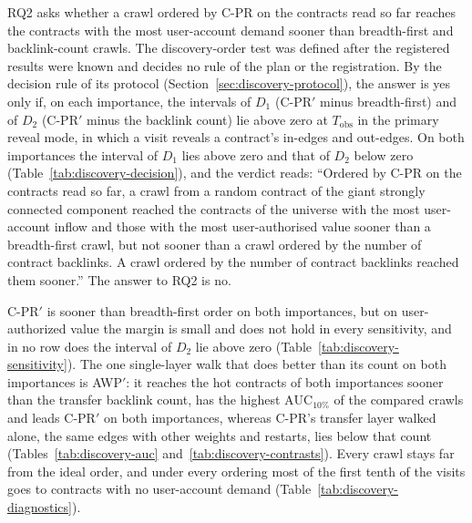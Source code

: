 RQ2 asks whether a crawl ordered by \mbox{C-PR} on the contracts read so far reaches the contracts with the most user-account demand sooner than breadth-first and backlink-count crawls. The discovery-order test was defined after the registered results were known and decides no rule of the plan or the registration. By the decision rule of its protocol (Section~\ref{sec:discovery-protocol}), the answer is yes only if, on each importance, the intervals of $D_1$ (\mbox{C-PR}$'$ minus breadth-first) and of $D_2$ (\mbox{C-PR}$'$ minus the backlink count) lie above zero at $T_{\mathrm{obs}}$ in the primary reveal mode, in which a visit reveals a contract's in-edges and out-edges. On both importances the interval of $D_1$ lies above zero and that of $D_2$ below zero (Table~\ref{tab:discovery-decision}), and the verdict reads: ``Ordered by \mbox{C-PR} on the contracts read so far, a crawl from a random contract of the giant strongly connected component reached the contracts of the universe with the most user-account inflow and those with the most user-authorised value sooner than a breadth-first crawl, but not sooner than a crawl ordered by the number of contract backlinks. A crawl ordered by the number of contract backlinks reached them sooner.'' The answer to RQ2 is no.

\mbox{C-PR}$'$ is sooner than breadth-first order on both importances, but on user-authorized value the margin is small and does not hold in every sensitivity, and in no row does the interval of $D_2$ lie above zero (Table~\ref{tab:discovery-sensitivity}). The one single-layer walk that does better than its count on both importances is AWP$'$: it reaches the hot contracts of both importances sooner than the transfer backlink count, has the highest $\mathrm{AUC}_{10\%}$ of the compared crawls and leads \mbox{C-PR}$'$ on both importances, whereas \mbox{C-PR}'s transfer layer walked alone, the same edges with other weights and restarts, lies below that count (Tables~\ref{tab:discovery-auc} and~\ref{tab:discovery-contrasts}). Every crawl stays far from the ideal order, and under every ordering most of the first tenth of the visits goes to contracts with no user-account demand (Table~\ref{tab:discovery-diagnostics}).

